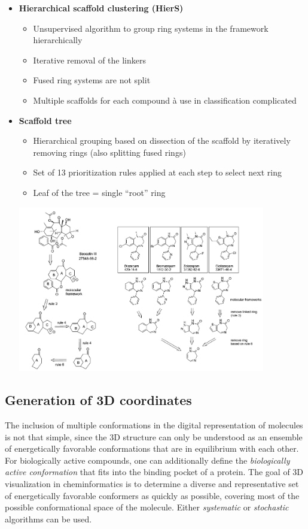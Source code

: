 \begin{itemize}
    \item \textbf{Hierarchical scaffold clustering (HierS)}
    \begin{itemize}
        \item Unsupervised algorithm to group ring systems in the framework hierarchically
        \item Iterative removal of the linkers
        \item Fused ring systems are not split
        \item Multiple scaffolds for each compound à use in classification complicated
    \end{itemize}
    \item \textbf{Scaffold tree}
    \begin{itemize}
        \item Hierarchical grouping based on dissection of the scaffold by iteratively removing rings (also splitting fused rings)
        \item Set of 13 prioritization rules applied at each step to select next ring
        \item Leaf of the tree = single “root” ring
    \end{itemize}
    \begin{center}\includegraphics[width=0.85\textwidth]{img/cheminformatics/McsScaffoldsTree.png}\end{center}
\end{itemize}

\subsection{Generation of 3D coordinates}

The inclusion of multiple conformations in the digital representation of molecules is not that simple, since the 3D structure can only be understood as an ensemble of energetically favorable conformations that are in equilibrium with each other. For biologically active compounds, one can additionally define the \emph{biologically active conformation} that fits into the binding pocket of a protein. The goal of 3D visualization in cheminformatics is to determine a diverse and representative set of energetically favorable conformers as quickly as possible, covering most of the possible conformational space of the molecule. Either \emph{systematic} or \emph{stochastic} algorithms can be used.


